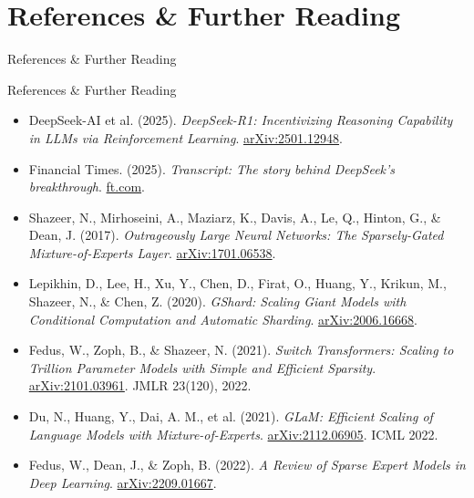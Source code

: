 \section{References \& Further Reading}
\begin{frame}[allowframebreaks]{}
    \LARGE References \& Further Reading
\end{frame}

\begin{frame}[allowframebreaks]{References \& Further Reading}
\begin{itemize}

\item DeepSeek-AI et al. (2025). \emph{DeepSeek-R1: Incentivizing Reasoning Capability in LLMs via Reinforcement Learning}. \href{https://arxiv.org/abs/2501.12948}{arXiv:2501.12948}.

\item Financial Times. (2025). \emph{Transcript: The story behind DeepSeek's breakthrough}. \href{https://www.ft.com/content/d23a01d8-4256-4142-a52c-a393ed6df1bc}{ft.com}.

\item Shazeer, N., Mirhoseini, A., Maziarz, K., Davis, A., Le, Q., Hinton, G., \& Dean, J. (2017). \emph{Outrageously Large Neural Networks: The Sparsely-Gated Mixture-of-Experts Layer}. \href{https://arxiv.org/abs/1701.06538}{arXiv:1701.06538}.

\item Lepikhin, D., Lee, H., Xu, Y., Chen, D., Firat, O., Huang, Y., Krikun, M., Shazeer, N., \& Chen, Z. (2020). \emph{GShard: Scaling Giant Models with Conditional Computation and Automatic Sharding}. \href{https://arxiv.org/abs/2006.16668}{arXiv:2006.16668}.

\item Fedus, W., Zoph, B., \& Shazeer, N. (2021). \emph{Switch Transformers: Scaling to Trillion Parameter Models with Simple and Efficient Sparsity}. \href{https://arxiv.org/abs/2101.03961}{arXiv:2101.03961}. JMLR 23(120), 2022.

\item Du, N., Huang, Y., Dai, A. M., et al. (2021). \emph{GLaM: Efficient Scaling of Language Models with Mixture-of-Experts}. \href{https://arxiv.org/abs/2112.06905}{arXiv:2112.06905}. ICML 2022.

\item Fedus, W., Dean, J., \& Zoph, B. (2022). \emph{A Review of Sparse Expert Models in Deep Learning}. \href{https://arxiv.org/abs/2209.01667}{arXiv:2209.01667}.


\end{itemize}
\end{frame}
